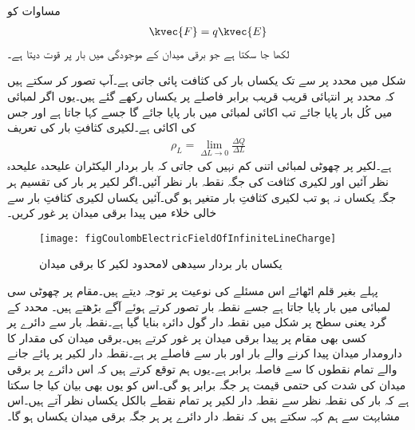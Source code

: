 مساوات  کو
\begin{align}
\kvec{F}=q \kvec{E}
\end{align}
لکھا جا سکتا ہے جو برقی میدان  کے موجودگی میں بار  پر قوت  دیتا ہے۔


شکل  میں  محدد پر  سے  تک یکساں بار کی کثافت پائی جاتی ہے۔آپ تصور کر سکتے ہیں کہ  محدد پر انتہائی قریب قریب برابر فاصلے پر یکساں  رکھے گئے ہیں۔یوں اگر  لمبائی میں کُل  بار پایا جائے تب اکائی لمبائی میں  بار پایا جائے گا جسے    کہا جاتا ہے اور جس کی اکائی  ہے۔لکیری کثافتِ بار کی تعریف
\begin{align}
\rho_L=\lim_{\Delta L \to 0}\frac{\Delta Q}{\Delta L}
\end{align}
ہے۔لکیر پر چھوٹی لمبائی  اتنی کم نہیں کی جاتی کہ بار بردار الیکٹران علیحدہ علیحدہ نظر آئیں اور لکیری کثافت کی جگہ نقطہ بار نظر آئیں۔اگر لکیر پر بار کی تقسیم ہر جگہ یکساں نہ ہو تب لکیری کثافتِ بار متغیر ہو گی۔آئیں یکساں لکیری کثافتِ بار سے خالی خلاء میں پیدا برقی میدان پر غور کریں۔ 
 \begin{figure}
\centering
\texttt{[image: figCoulombElectricFieldOfInfiniteLineCharge]}
\caption{یکساں بار بردار سیدھی لامحدود لکیر  کا برقی میدان}
\label{شکل_کولمب_لامحدود_لکیر_پر_بار_کا_میدان}
\end{figure}

پہلے بغیر قلم اٹھائے اس مسئلے کی نوعیت پر توجہ دیتے ہیں۔مقام  پر  چھوٹی سی لمبائی  میں  بار پایا جاتا ہے جسے نقطہ بار تصور کرتے ہوئے آگے بڑھتے ہیں۔ محدد کے گرد  یعنی   سطح پر  شکل  میں نقطہ دار گول دائرہ بنایا گیا ہے۔نقطہ بار  سے دائرے پر کسی بھی مقام پر پیدا برقی میدان پر غور کرتے ہیں۔برقی میدان کی مقدار کا دارومدار میدان پیدا کرنے والے بار اور بار سے فاصلے پر ہے۔نقطہ دار لکیر پر پائے جانے والے تمام نقطوں کا  سے فاصلہ برابر ہے۔یوں ہم توقع کرتے ہیں کہ اس دائرے پر برقی میدان کی شدت کی حتمی قیمت ہر جگہ برابر ہو گی۔اس کو یوں بھی بیان کیا جا سکتا ہے کہ بار کی نقطہ نظر سے نقطہ دار لکیر پر تمام نقطے بالکل یکساں نظر آتے ہیں۔اس مشابہت سے ہم کہہ سکتے ہیں کہ نقطہ دار دائرے پر ہر جگہ برقی میدان یکساں ہو گا۔ 

